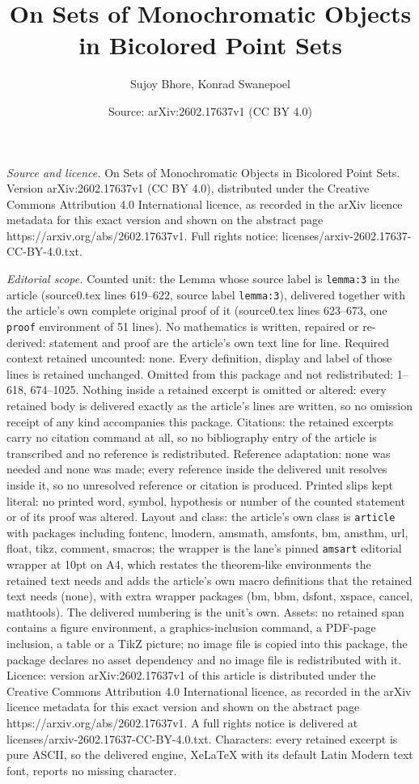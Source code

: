 \documentclass[10pt,a4paper]{amsart}
\title[On Sets of Monochromatic Objects in Bicolored Point Sets]{On Sets of Monochromatic Objects in Bicolored Point Sets}
\author{Sujoy Bhore, Konrad Swanepoel}
\date{Source: arXiv:2602.17637v1 (CC BY 4.0)}
\begin{document}
\maketitle

\noindent\emph{Source and licence.} On Sets of Monochromatic Objects in Bicolored Point Sets. Version arXiv:2602.17637v1 (CC BY 4.0), distributed under the Creative Commons Attribution 4.0 International licence, as recorded in the arXiv licence metadata for this exact version and shown on the abstract page https://arxiv.org/abs/2602.17637v1. Full rights notice: licenses/arxiv-2602.17637-CC-BY-4.0.txt.\par\smallskip

\noindent\textit{Editorial scope.} Counted unit: the Lemma whose source label is \texttt{lemma:3} in the article (source0.tex lines 619--622, source label \texttt{lemma:3}), delivered together with the article's own complete original proof of it (source0.tex lines 623--673, one \texttt{proof} environment of 51 lines). No mathematics is written, repaired or re-derived: statement and proof are the article's own text line for line. Required context retained uncounted: none. Every definition, display and label of those lines is retained unchanged. Omitted from this package and not redistributed: 1--618, 674--1025. Nothing inside a retained excerpt is omitted or altered: every retained body is delivered exactly as the article's lines are written, so no omission receipt of any kind accompanies this package. Citations: the retained excerpts carry no citation command at all, so no bibliography entry of the article is transcribed and no reference is redistributed. Reference adaptation: none was needed and none was made; every reference inside the delivered unit resolves inside it, so no unresolved reference or citation is produced. Printed slips kept literal: no printed word, symbol, hypothesis or number of the counted statement or of its proof was altered. Layout and class: the article's own class is \texttt{article} with packages including fontenc, lmodern, amsmath, amsfonts, bm, amsthm, url, float, tikz, comment, smacros; the wrapper is the lane's pinned \texttt{amsart} editorial wrapper at 10pt on A4, which restates the theorem-like environments the retained text needs and adds the article's own macro definitions that the retained text needs (none), with extra wrapper packages (bm, bbm, dsfont, xspace, cancel, mathtools). The delivered numbering is the unit's own. Assets: no retained span contains a figure environment, a graphics-inclusion command, a PDF-page inclusion, a table or a TikZ picture; no image file is copied into this package, the package declares no asset dependency and no image file is redistributed with it. Licence: version arXiv:2602.17637v1 of this article is distributed under the Creative Commons Attribution 4.0 International licence, as recorded in the arXiv licence metadata for this exact version and shown on the abstract page https://arxiv.org/abs/2602.17637v1. A full rights notice is delivered at licenses/arxiv-2602.17637-CC-BY-4.0.txt. Characters: every retained excerpt is pure ASCII, so the delivered engine, XeLaTeX with its default Latin Modern text font, reports no missing character.
\end{document}
